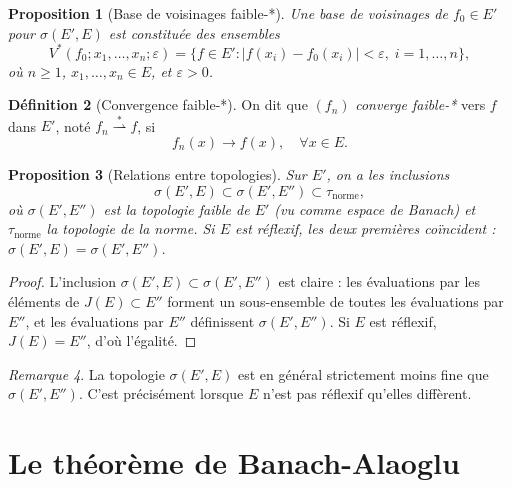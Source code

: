 \documentclass[a4paper,12pt]{book}
\newcommand{\abs}[1]{\left| #1 \right|}
\newcommand{\weakstarto}{\overset{*}{\rightharpoonup}}
\theoremstyle{definition}
\newtheorem{definition}{Définition}[chapter]
\theoremstyle{plain}
\newtheorem{proposition}[definition]{Proposition}
\theoremstyle{remark}
\newtheorem{remarque}[definition]{Remarque}
\begin{document}
\begin{proposition}[Base de voisinages faible-*]
\label{prop:base-voisinages-faible-etoile}
Une base de voisinages de $f_0 \in E'$ pour $\sigma(E', E)$ est constituée des
ensembles
\[
  V^*(f_0; x_1, \ldots, x_n; \varepsilon) = \bigl\{ f \in E' :
  \abs{f(x_i) - f_0(x_i)} < \varepsilon, \; i = 1, \ldots, n \bigr\},
\]
où $n \ge 1$, $x_1, \ldots, x_n \in E$, et $\varepsilon > 0$.
\end{proposition}

\begin{definition}[Convergence faible-*]
\label{def:conv-faible-etoile}
\index{weakstarto@$\weakstarto$}
On dit que $(f_n)$ \emph{converge faible-*} vers $f$ dans $E'$, noté
$f_n \weakstarto f$, si
\[
  f_n(x) \to f(x), \quad \forall x \in E.
\]
\end{definition}

\begin{proposition}[Relations entre topologies]
\label{prop:relations-topologies}
Sur $E'$, on a les inclusions
\[
  \sigma(E', E) \subset \sigma(E', E'') \subset \tau_{\text{norme}},
\]
où $\sigma(E', E'')$ est la topologie faible de $E'$ (vu comme espace de Banach)
et $\tau_{\text{norme}}$ la topologie de la norme. Si $E$ est réflexif, les deux
premières coïncident : $\sigma(E', E) = \sigma(E', E'')$.
\end{proposition}

\begin{proof}
L'inclusion $\sigma(E',E) \subset \sigma(E',E'')$ est claire : les évaluations par les
éléments de $J(E) \subset E''$ forment un sous-ensemble de toutes les évaluations par
$E''$, et les évaluations par $E''$ définissent $\sigma(E',E'')$. Si $E$ est réflexif,
$J(E) = E''$, d'où l'égalité.
\end{proof}

\begin{remarque}
\label{rem:faible-etoile-vs-faible}
La topologie $\sigma(E',E)$ est en général strictement moins fine que $\sigma(E',E'')$.
C'est précisément lorsque $E$ n'est pas réflexif qu'elles diffèrent.
\end{remarque}

\section{Le théorème de Banach-Alaoglu}
\label{sec:banach-alaoglu}
\end{document}
